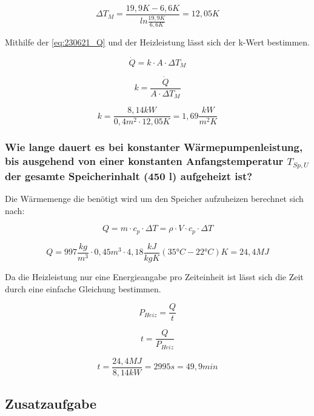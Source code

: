 $$\Delta T_M= \frac{19,9K-6,6K}{ln\frac{19,9K}{6,6K}}= 12,05K$$

Mithilfe der \autoref{eq:230621_Q} und der Heizleistung lässt sich der k-Wert bestimmen.

\begin{equation}
    \dot{Q}=k\cdot A \cdot \Delta T_M
    \label{eq:230621_Q}
\end{equation}

\begin{equation}
    k = \frac{\dot{Q}}{ A \cdot \Delta T_M} 
    \label{eq:230621_k}
\end{equation}

$$k=\frac{8,14 kW}{ 0,4m^2 \cdot 12,05K}=1,69 \frac{kW}{m^2K}$$

\subsubsection{Wie lange dauert es bei konstanter Wärmepumpenleistung, bis ausgehend von einer
konstanten Anfangstemperatur \texorpdfstring{$T_{Sp,U}$}{} der gesamte Speicherinhalt (450 l) aufgeheizt ist?}

Die Wärmemenge die benötigt wird um den Speicher aufzuheizen berechnet sich nach:

\begin{equation}
Q = m \cdot c_p \cdot \Delta T = \rho \cdot V \cdot c_p \cdot \Delta T
\end{equation}

$$ Q = 997 \frac{kg}{m^3} \cdot 0,45 m^3 \cdot 4,18 \frac{kJ}{kg K} (35 \text{°} C-22 \text{°} C)K=24,4 MJ$$

Da die Heizleistung nur eine Energieangabe pro Zeiteinheit ist lässt sich die Zeit durch eine einfache Gleichung bestimmen.

\begin{equation}
    P_{Heiz}= \frac{Q}{t}
\end{equation}

\begin{equation}
 t = \frac{Q}{P_{Heiz}}
\end{equation}

$$ t= \frac{24,4 MJ}{8,14 kW}=2995 s= 49,9 min$$

\subsection{Zusatzaufgabe}

